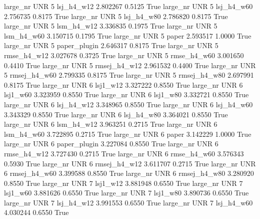   large_nr      UNR                 5   lsj_h4_w12    2.802267      0.5125    True
  large_nr      UNR                 5   lsj_h4_w60    2.756735      0.8175    True
  large_nr      UNR                 5   lsj_h4_w80    2.786820      0.8175    True
  large_nr      UNR                 5   lsm_h4_w12    3.336835      0.1975    True
  large_nr      UNR                 5   lsm_h4_w60    3.150715      0.1795    True
  large_nr      UNR                 5        paper    2.593517      1.0000    True
  large_nr      UNR                 5 paper_plugin    2.646317      0.8175    True
  large_nr      UNR                 5  rmse_h4_w12    3.027678      0.3725    True
  large_nr      UNR                 5  rmse_h4_w60    3.001650      0.4410    True
  large_nr      UNR                 5 rmsej_h4_w12    2.961532      0.4400    True
  large_nr      UNR                 5 rmsej_h4_w60    2.799335      0.8175    True
  large_nr      UNR                 5 rmsej_h4_w80    2.697991      0.8175    True
  large_nr      UNR                 6     lsj1_w12    3.327222      0.8550    True
  large_nr      UNR                 6     lsj1_w60    3.323959      0.8550    True
  large_nr      UNR                 6     lsj1_w80    3.332721      0.8550    True
  large_nr      UNR                 6   lsj_h4_w12    3.348965      0.8550    True
  large_nr      UNR                 6   lsj_h4_w60    3.343329      0.8550    True
  large_nr      UNR                 6   lsj_h4_w80    3.364021      0.8550    True
  large_nr      UNR                 6   lsm_h4_w12    3.963251      0.2715    True
  large_nr      UNR                 6   lsm_h4_w60    3.722895      0.2715    True
  large_nr      UNR                 6        paper    3.142229      1.0000    True
  large_nr      UNR                 6 paper_plugin    3.227084      0.8550    True
  large_nr      UNR                 6  rmse_h4_w12    3.727430      0.2715    True
  large_nr      UNR                 6  rmse_h4_w60    3.576343      0.5930    True
  large_nr      UNR                 6 rmsej_h4_w12    3.611707      0.2715    True
  large_nr      UNR                 6 rmsej_h4_w60    3.399588      0.8550    True
  large_nr      UNR                 6 rmsej_h4_w80    3.280920      0.8550    True
  large_nr      UNR                 7     lsj1_w12    3.881948      0.6550    True
  large_nr      UNR                 7     lsj1_w60    3.881626      0.6550    True
  large_nr      UNR                 7     lsj1_w80    3.890736      0.6550    True
  large_nr      UNR                 7   lsj_h4_w12    3.991553      0.6550    True
  large_nr      UNR                 7   lsj_h4_w60    4.030244      0.6550    True
